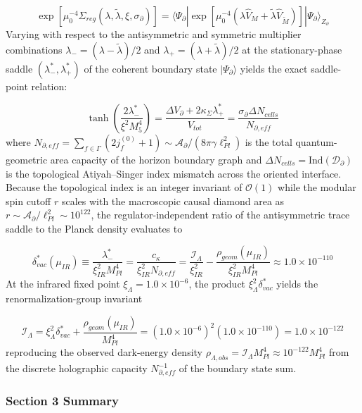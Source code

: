 \documentclass[aps,prd,onecolumn,superscriptaddress,nofootinbib,longbibliography,10pt]{revtex4-2}
\begin{document}
  \[ \exp\left[\mu_0^{-4}\Sigma_{reg}(\lambda,\tilde{\lambda},\xi,\sigma_\partial)\right] = \langle \Psi_\partial | \exp\left[\mu_0^{-4}(\lambda \hat{V}_M + \tilde{\lambda} \hat{V}_{\tilde{M}})\right] | \Psi_\partial \rangle_{Z_\partial} \]
  Varying with respect to the antisymmetric and symmetric multiplier combinations \(\lambda_- = (\lambda - \tilde{\lambda})/2\) and \(\lambda_+ = (\lambda + \tilde{\lambda})/2\) at the stationary-phase saddle \((\lambda_-^*, \lambda_+^*)\) of the coherent boundary state \(|\Psi_\partial\rangle\) yields the exact saddle-point relation:


  \[ \tanh\left(\frac{2\lambda_-^*}{\xi^2 M_5^4}\right) = \frac{\Delta V_\partial + 2\kappa_\Sigma \lambda_+^*}{V_{tot}} = \frac{\sigma_\partial \Delta N_{cells}}{N_{\partial,eff}} \]
  where \(N_{\partial,eff} = \sum_{f\in\Gamma}(2j_f^{(0)} + 1) \sim \mathcal{A}_\partial/(8\pi\gamma \ell_{Pl}^2)\) is the total quantum-geometric area capacity of the horizon boundary graph and \(\Delta N_{cells} = \text{Ind}(\mathcal{D}_\partial)\) is the topological Atiyah–Singer index mismatch across the oriented interface. Because the topological index is an integer invariant of \(\mathcal{O}(1)\) while the modular spin cutoff \(r\) scales with the macroscopic causal diamond area as \(r \sim \mathcal{A}_\partial/\ell_{Pl}^2 \sim 10^{122}\), the regulator-independent ratio of the antisymmetric trace saddle to the Planck density evaluates to


  \[ \delta_{vac}^*(\mu_{IR}) \equiv \frac{\lambda_-^*}{\xi_{IR}^2 M_{Pl}^4} = \frac{c_\kappa}{\xi_{IR}^2 N_{\partial,eff}} = \frac{\mathcal{I}_\Lambda}{\xi_{IR}^2} - \frac{\rho_{geom}(\mu_{IR})}{\xi_{IR}^2 M_{Pl}^4} \approx 1.0 \times 10^{-110} \]
  At the infrared fixed point \(\xi_\Lambda = 1.0 \times 10^{-6}\), the product \(\xi_\Lambda^2 \delta_{vac}^*\) yields the renormalization-group invariant


  \[ \mathcal{I}_\Lambda = \xi_\Lambda^2 \delta_{vac}^* + \frac{\rho_{geom}(\mu_{IR})}{M_{Pl}^4} = (1.0 \times 10^{-6})^2 (1.0 \times 10^{-110}) = 1.0 \times 10^{-122} \]
  reproducing the observed dark-energy density \(\rho_{\Lambda,obs} = \mathcal{I}_\Lambda M_{Pl}^4 \approx 10^{-122} M_{Pl}^4\) from the discrete holographic capacity \(N_{\partial,eff}^{-1}\) of the boundary state sum.


  
\subsubsection*{Section 3 Summary}
\end{document}
